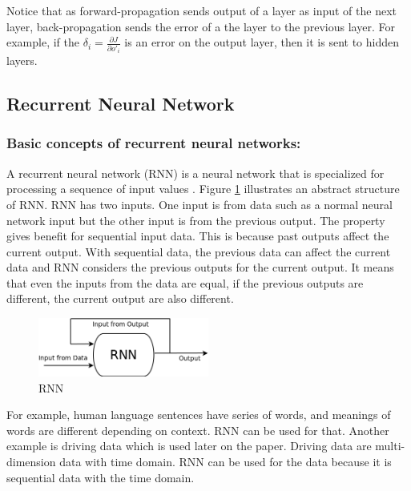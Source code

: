 \documentclass[draft,dvipsnames]{drexel-thesis}
\begin{document}
\begin{thesis}
Notice that as forward-propagation sends output of a layer as input of the next layer, back-propagation sends the error of a the layer to the previous layer. For example, if the $\delta_i=\frac{\partial J}{\partial o'_i}$ is an error on the output layer, then it is sent to hidden layers.




\subsection{Recurrent Neural Network}\label{subsec:RNN}

\subsubsection{Basic concepts of recurrent neural networks:}\label{basicRNN}
	A recurrent neural network (RNN) is a neural network that is specialized for processing a sequence of input values \cite{Goodfellow-et-al-2016}. Figure \ref{fig:RNN} illustrates an abstract structure of RNN. RNN has two inputs. One input is from data such as a normal neural network input but the other input is from the previous output. The property gives benefit for sequential input data. This is because past outputs affect the current output. With sequential data, the previous data can affect the current data and RNN considers the previous outputs for the current output. It means that even the inputs from the data are equal, if the previous outputs are different, the current output are also different.

\begin{figure}[t!]
    \centering
    \includegraphics[width=0.5\textwidth]{pictures/figures/RNN.png}
    \caption{RNN}
    \label{fig:RNN}
\end{figure}

	For example, human language sentences have series of words, and meanings of words are different depending on context. RNN can be used for that. Another example is driving data which is used later on the paper.  Driving data are multi-dimension data with time domain. RNN can be used for the data because it is sequential data with the time domain.


\end{thesis}
\end{document}
